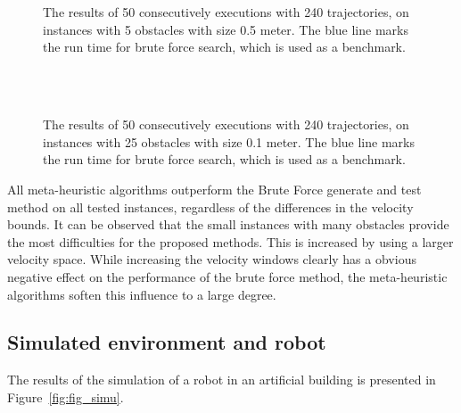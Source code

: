 \begin{figure}[thb]
   \myfloatalign
    \tiny
          \centering
    \\
    \\
    \caption[Experiment: Medium obstacle instances with different velocity bounds]{The results of 50 consecutively executions with 240 trajectories, on instances with 5 obstacles with size 0.5 meter. The blue line marks the run time for brute force search, which is used as a benchmark.}  
     \label{fig:fig_vel_medium}
\end{figure} 

\begin{figure}[thb]
   \myfloatalign
    \tiny
          \centering
    \\
    \\
    \caption[Experiment: Small obstacle instances with different velocity bounds]{The results of 50 consecutively executions with 240 trajectories, on instances with 25 obstacles with size 0.1 meter. The blue line marks the run time for brute force search, which is used as a benchmark.}  
     \label{fig:fig_vel_small}
\end{figure}

All meta-heuristic algorithms outperform the Brute Force generate and test method on all tested instances, regardless of the differences in the velocity bounds.
It can be observed that the small instances with many obstacles provide the most difficulties for the proposed methods.
This is increased by using a larger velocity space.
While increasing the velocity windows clearly has a obvious negative effect on the performance of the brute force method, the meta-heuristic algorithms soften this influence to a large degree. 

\subsection{Simulated environment and robot}
The results of the simulation of a robot in an artificial building is presented in Figure~\ref{fig:fig_simu}. 
 
